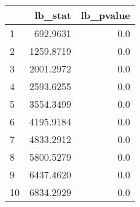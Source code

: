 \begin{tabular}{lrr}
\toprule
{} &    lb\_stat &  lb\_pvalue \\
\midrule
1  &   692.9631 &        0.0 \\
2  &  1259.8719 &        0.0 \\
3  &  2001.2972 &        0.0 \\
4  &  2593.6255 &        0.0 \\
5  &  3554.3499 &        0.0 \\
6  &  4195.9184 &        0.0 \\
7  &  4833.2912 &        0.0 \\
8  &  5800.5279 &        0.0 \\
9  &  6437.4620 &        0.0 \\
10 &  6834.2929 &        0.0 \\
\bottomrule
\end{tabular}
